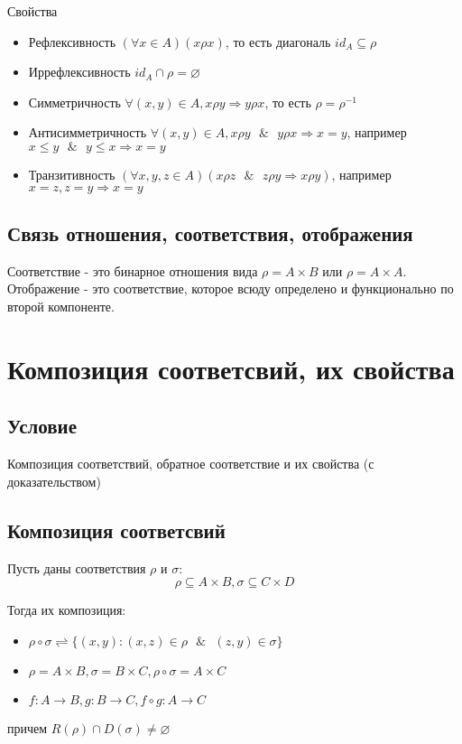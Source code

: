 \documentclass{report}
\newcommand{\band}{\mbox{ } \& \mbox{ }}
\begin{document}
Свойства
\begin{itemize}
	\item Рефлексивность\newline
	      $(\forall x \in A)(x\rho x)$, то есть диагональ $id_A \subseteq \rho$
	\item Иррефлексивность\newline
	      $id_A \cap \rho = \varnothing$
	\item Симметричность\newline
	      $\forall (x,y) \in A, x\rho y \Rightarrow y\rho x$, то есть $\rho = \rho^{-1}$
	\item  Антисимметричность\newline
	      $\forall (x,y) \in A, x\rho y \band y\rho x \Rightarrow x = y$, например $x \leq y \band y \leq x \Rightarrow x = y$
	\item Транзитивность\newline
	      $(\forall x,y,z \in A)(x\rho z \band z\rho y \Rightarrow x\rho y)$, например $x = z, z = y \Rightarrow x = y$
\end{itemize}

\subsection{Связь отношения, соответствия, отображения}
Соответствие - это бинарное отношения вида $\rho = A \times B$ или $\rho = A \times A$.
Отображение - это соответствие, которое всюду определено и функционально по второй компоненте.

\section{Композиция соответсвий, их свойства}
\subsection{Условие}
Композиция соответствий, обратное соответствие и их свойства (с доказательством)

\subsection{Композиция соответсвий}
Пусть даны соответствия $\rho$ и  $\sigma$:
\[
\rho \subseteq A \times B, \sigma \subseteq C \times D
\] 

\medskip

Тогда их композиция:
\begin{itemize}
	\item $\rho \circ \sigma \rightleftharpoons \{(x,y): (x,z) \in \rho \band (z,y) \in \sigma\}$
	\item  $\rho = A \times B, \sigma = B \times C, \rho \circ \sigma = A \times C$
	\item $f: A \rightarrow B, g: B \rightarrow C, f \circ g: A \rightarrow C$
\end{itemize}
причем $R(\rho) \cap D(\sigma) \neq \varnothing$
\end{document}
